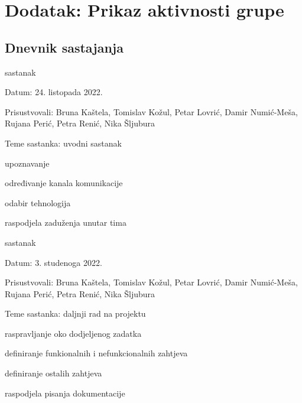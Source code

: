 \chapter*{Dodatak: Prikaz aktivnosti grupe}
		
		\section*{Dnevnik sastajanja}
						
		\begin{packed_enum}
			\item  sastanak
			
			\item[] \begin{packed_item}

				\item Datum: 24. listopada 2022.
				\item Prisustvovali: Bruna Kaštela, Tomislav Kožul, Petar Lovrić, Damir Numić-Meša, Rujana Perić, Petra Renić, Nika Šljubura
				\item Teme sastanka: uvodni sastanak
				\begin{packed_item}
					\item  upoznavanje
					\item  određivanje kanala komunikacije
                    \item  odabir tehnologija
                    \item  raspodjela zaduženja unutar tima

				\end{packed_item}
			\end{packed_item}
			
			\item  sastanak
			\item[] \begin{packed_item}

				\item Datum: 3. studenoga 2022.
				\item Prisustvovali: Bruna Kaštela, Tomislav Kožul, Petar Lovrić, Damir Numić-Meša, Rujana Perić, Petra Renić, Nika Šljubura
				\item Teme sastanka: daljnji rad na projektu
				\begin{packed_item}

					\item  raspravljanje oko dodjeljenog zadatka
					\item  definiranje funkionalnih i nefunkcionalnih zahtjeva
                    \item  definiranje ostalih zahtjeva
                    \item  raspodjela pisanja dokumentacije
				\end{packed_item}
			\end{packed_item}
        \eject


\end{packed_enum}

